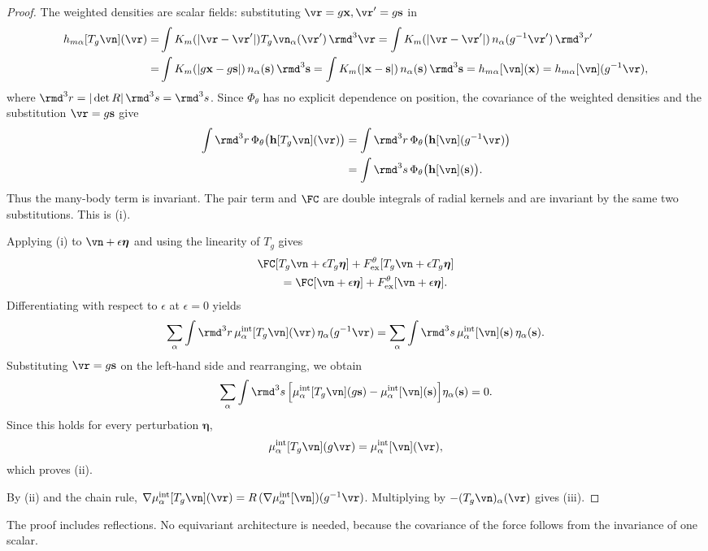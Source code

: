 \begin{proof}
The weighted densities are scalar fields: substituting $\vr = g{\mathbf x}, \vr'=g\mathbf s$ in 
\[
\begin{aligned}
    h_{m\alpha}[T_g\vn](\vr)= &
\int K_m(|\vr-\vr' |) T_g\vn_\alpha(\vr' )\,\rmd^3 \vr  = 
\int K_m(|\vr-\vr'|)\,n_\alpha(g^{-1}\vr')\,\rmd^3r' \\
= & \int K_m(|g\mathbf x-g\mathbf s|)\,n_\alpha(\mathbf s)\,\rmd^3\mathbf s  =  \int K_m(|\mathbf x-\mathbf s|)\,n_\alpha(\mathbf s)\,\rmd^3\mathbf s = h_{m\alpha}[\vn](\mathbf x) = h_{m\alpha}[\vn](g^{-1}\vr),
\end{aligned}
\]  
where $\rmd^3r=|\det R|\,\rmd^3s=\rmd^3s$.
Since $\Phi_\theta$ has no explicit dependence on position,
the covariance of the weighted densities and the substitution
$\vr=g\mathbf s$ give
\[
\begin{aligned}
\int \rmd^3r\,
\Phi_\theta\big(\mathbf h[T_g\vn](\vr)\big)
&=
\int \rmd^3r\,
\Phi_\theta\big(\mathbf h[\vn](g^{-1}\vr)\big)\\
&=
\int \rmd^3s\,
\Phi_\theta\big(\mathbf h[\vn](\mathbf s)\big).
\end{aligned}
\]
Thus the many-body term is invariant.
The pair term and $\FC$ are double integrals of radial kernels and are invariant by the same two substitutions. This is (i).

Applying (i) to $\vn+\epsilon\boldsymbol\eta$ and using the
linearity of $T_g$ gives
\[
\begin{aligned}
&\FC[T_g\vn+\epsilon T_g\boldsymbol\eta]
+F^\theta_{\rm ex}[T_g\vn+\epsilon T_g\boldsymbol\eta]\\
&\qquad=
\FC[\vn+\epsilon\boldsymbol\eta]
+F^\theta_{\rm ex}[\vn+\epsilon\boldsymbol\eta].
\end{aligned}
\]
Differentiating with respect to $\epsilon$ at $\epsilon=0$ yields
\[
\sum_\alpha\int \rmd^3r\,
\mu^{\rm int}_\alpha[T_g\vn](\vr)\,
\eta_\alpha(g^{-1}\vr)
=
\sum_\alpha\int \rmd^3s\,
\mu^{\rm int}_\alpha[\vn](\mathbf s)\,
\eta_\alpha(\mathbf s).
\]
Substituting $\vr=g\mathbf s$ on the left-hand side and
rearranging, we obtain
\[
\sum_\alpha\int \rmd^3s\,
\Big[
\mu^{\rm int}_\alpha[T_g\vn](g\mathbf s)
-\mu^{\rm int}_\alpha[\vn](\mathbf s)
\Big]\eta_\alpha(\mathbf s)=0.
\]
Since this holds for every perturbation $\boldsymbol\eta$,
\[
\mu^{\rm int}_\alpha[T_g\vn](g\vr)
=
\mu^{\rm int}_\alpha[\vn](\vr),
\]
which proves (ii).

By (ii) and the chain rule, $\nabla\mu^{\rm int}_\alpha[T_g\vn](\vr)=R\,(\nabla\mu^{\rm int}_\alpha[\vn])(g^{-1}\vr)$. Multiplying by $-(T_g\vn)_\alpha(\vr)$ gives (iii).
\end{proof}
The proof includes reflections. No equivariant architecture is needed, because the covariance of the force follows from the invariance of one scalar.

